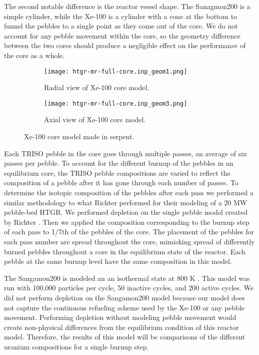 The second 
notable difference is the reactor vessel shape. The Sanagmon200 is a simple 
cylinder, while the Xe-100 is a cylinder with a cone at the bottom to funnel 
the pebbles to a single point as they come out of the core. We do not account 
for any pebble movement within the core, so the geometry difference between 
the two cores should produce a negligible effect on the performance of the 
core as a whole.

\begin{figure}
    \centering 
    \begin{subfigure}{0.45\textwidth}
        \centering 
        \texttt{[image: htgr-mr-full-core.inp\_geom1.png]}
        \caption{Radial view of Xe-100 core model.}
        \label{fig:xe100_core_radial}        
    \end{subfigure}
    \hfill
    \begin{subfigure}{0.45\textwidth}
        \centering 
        \texttt{[image: htgr-mr-full-core.inp\_geom3.png]}
        \caption{Axial view of Xe-100 core model.}
        \label{fig:xe100_core_axial}        
    \end{subfigure}
    \caption{Xe-100 core model made in serpent.}
    \label{fig:xe100_core}
\end{figure}

Each \gls{TRISO} pebble in the core goes through multiple passes, an average 
of six passes per pebble. To account for the different burnup of 
the pebbles in an equilibrium core, the \gls{TRISO} pebble compositions are 
varied to reflect the composition of a pebble after it has gone through 
each number of passes. To determine the isotopic composition of the 
pebbles after each pass we performed a similar methodology to what
Richter performed for their modeling of a 20 MW pebble-bed \gls{HTGR}. 
We performed depletion on the single pebble model 
created by Richter \cite{richter_zoerichterphlox_2022}. Then we 
applied the composition corresponding to the burnup step of each pass 
to 1/7th of the pebbles of the core. The placement of the pebbles for 
each pass number are spread throughout the core, mimicking spread of 
differently burned pebbles throughout a core in the equilibrium state 
of the reactor. Each pebble at the same burnup level have the same 
composition in this model.   

The Sangamon200 is modeled an an isothermal state at 800 K \cite{richter_isotopic_2022}.
This model was run with 100,000 particles per cycle, 50 inactive cycles, 
and 200 active cycles. We did not perform depletion on the Sangamon200 model 
because our model 
does not capture the continuous refueling scheme used by the Xe-100 or 
any pebble movement. Performing depletion without modeling pebble movement 
would create non-physical differences from the equilibrium condition of 
this reactor model. Therefore, the results of this model will be comparisons
of the different uranium compositions for a single burnup step.

